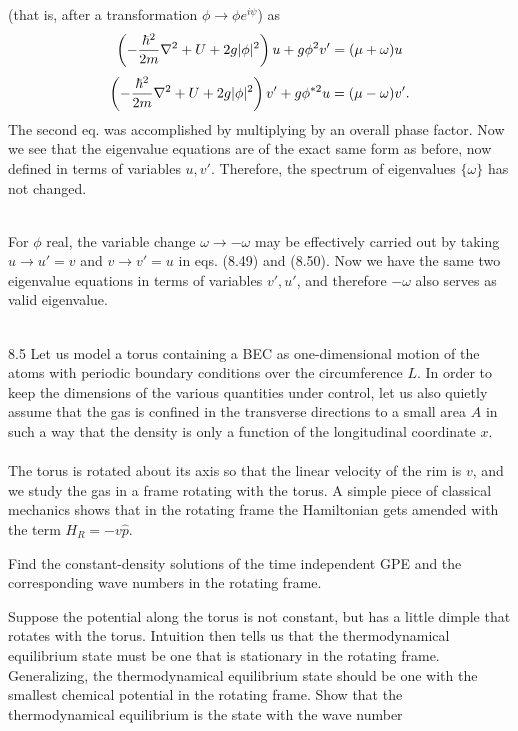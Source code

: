 \documentclass[10pt,letterpaper]{article}
\begin{document}
(that is, after a transformation $\phi \to \phi e^{i\psi}$) as
\[
	\left(-\frac{\hbar^2}{2m}\nabla^2+U+2g|\phi|^2\right)u+g\phi^2 v' = (\mu +\omega)u
\]
\[
	\left(-\frac{\hbar^2}{2m}\nabla^2+U+2g|\phi|^2\right)v'+g\phi^{*2} u = (\mu -\omega)v'.
\]
The second eq. was accomplished by multiplying by an overall phase factor. Now we see that the eigenvalue
equations are of the exact same form as before, now defined in terms of variables $u,v'$. Therefore, the spectrum of eigenvalues $\{\omega\}$ has not changed. \\ \\
\item 
For $\phi$ real, the variable change $\omega \to -\omega$ may be effectively carried out by taking 
$u\to u'= v$ and $v\to v'= u$ in eqs. (8.49) and (8.50). Now we have the same two eigenvalue equations in
terms of variables $v',u'$, and therefore $-\omega$ also serves as valid eigenvalue. \\ \\
\eenum
\item[8.5]
Let us model a torus containing a BEC as one-dimensional motion of the atoms with periodic boundary conditions
over the circumference $L$. In order to keep the dimensions of the various quantities under control, let us also
quietly assume that the gas is confined in the transverse directions to a small area $A$ in such a way that the density
is only a function of the longitudinal coordinate $x$.\\ \\
The torus is rotated about its axis so that the linear velocity of the rim is $v$, and we study the gas in a frame rotating
with the torus. A simple piece of classical mechanics shows that in the rotating frame the Hamiltonian gets 
amended with the term $H_R = -v\hat p$.
\benum
\item
Find the constant-density solutions of the time independent GPE and the corresponding wave numbers in the
rotating frame.
\item
Suppose the potential along the torus is not constant, but has a little dimple that rotates with the torus. Intuition
then tells us that the thermodynamical equilibrium state must be one that is stationary in the rotating frame.
Generalizing, the thermodynamical equilibrium state should be one with the smallest chemical potential in the rotating frame. Show that the thermodynamical equilibrium is the state with the wave number
\end{document}
